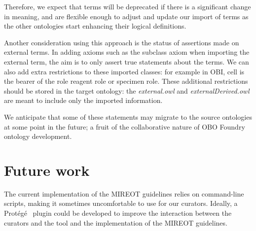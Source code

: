 \documentclass[a4paper,10pt,twocolumn]{article}
\newcommand{\protege}{Prot\'{e}g\'{e}}
\begin{document}
Therefore, we expect that terms will be deprecated if there is a significant change in meaning, and are flexible enough to adjust and update our import of terms as the other ontologies start enhancing their logical definitions.


Another consideration using this approach is the status of assertions made on external terms.
In adding axioms such as the subclass axiom when importing the external term, the aim is to only assert true statements about the terms.
We can also add extra restrictions to these imported classes: for example in OBI, cell is the bearer of the role reagent role or specimen role. 
These additional restrictions should be stored in the target ontology: the \emph{external.owl} and \emph{externalDerived.owl} are meant to include only the imported information.

We anticipate that some of these statements may migrate to the source ontologies at some point in the future; a fruit of the collaborative nature of OBO Foundry ontology development. 


\section*{Future work}
The current implementation of the \ac{MIREOT} guidelines relies on command-line scripts, making it sometimes uncomfortable to use for our curators.
Ideally, a \protege\ \cite{RefWorks:1501} plugin could be developed to improve the interaction between the curators and the tool and the implementation of the MIREOT guidelines.
\end{document}
